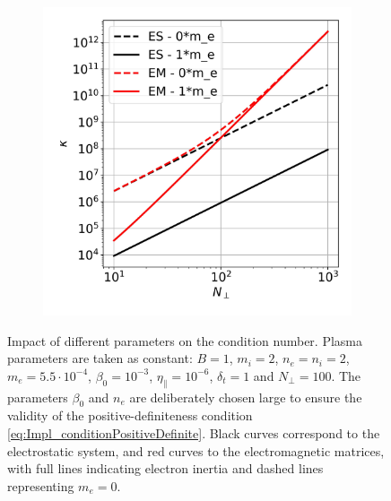 \begin{figure}[H]
\begin{subfigure}[t]{0.30\textwidth}
		\label{fig:Impl_conditionNumber_dt}
	\end{subfigure}
	\begin{subfigure}[t]{0.30\textwidth}
		\centering
		\includegraphics[width=1\textwidth]{schemes/conditionNumber_Nperp.jpg}
		\label{fig:Impl_conditionNumber_Nperp}
	\end{subfigure}
	\caption[Impact of different parameters on the condition number]{Impact of different parameters on the condition number. Plasma parameters are taken as constant: $B=1$, $m_i = 2$, $n_e = n_i = 2$, $m_e = 5.5\cdot 10^{-4}$, $\beta_0 = 10^{-3}$, $\eta_\parallel = 10^{-6}$, $\delta_t = 1$ and $N_\perp = 100$. The parameters $\beta_0$ and $n_e$ are deliberately chosen large to ensure the validity of the positive-definiteness condition \ref{eq:Impl_conditionPositiveDefinite}. Black curves correspond to the electrostatic system, and red curves to the electromagnetic matrices, with full lines indicating electron inertia and dashed lines representing $m_e = 0$.}
	\label{fig:Impl_conditionNumber}
\end{figure}

